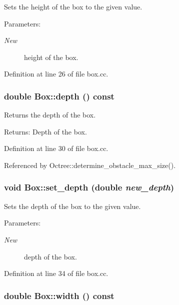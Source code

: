 Sets the height of the box to the given value. \begin{Desc}
\item[Parameters:]
\begin{description}
\item[{\em New}]height of the box. \end{description}
\end{Desc}


Definition at line 26 of file box.cc.\hypertarget{class_box_10dbd2cb5f3c37ca36792d4a1e34240d}{
\subsubsection[depth]{\setlength{\rightskip}{0pt plus 5cm}double Box::depth () const}}
\label{class_box_10dbd2cb5f3c37ca36792d4a1e34240d}


Returns the depth of the box. \begin{Desc}
\item[Returns:]Depth of the box. \end{Desc}


Definition at line 30 of file box.cc.

Referenced by Octree::determine\_\-obstacle\_\-max\_\-size().\hypertarget{class_box_8449b2ab9741bd60c24f15de96567a77}{
\subsubsection[set\_\-depth]{\setlength{\rightskip}{0pt plus 5cm}void Box::set\_\-depth (double {\em new\_\-depth})}}
\label{class_box_8449b2ab9741bd60c24f15de96567a77}


Sets the depth of the box to the given value. \begin{Desc}
\item[Parameters:]
\begin{description}
\item[{\em New}]depth of the box. \end{description}
\end{Desc}


Definition at line 34 of file box.cc.\hypertarget{class_box_cceec88bdb7cccd65b090837e919982c}{
\subsubsection[width]{\setlength{\rightskip}{0pt plus 5cm}double Box::width () const}}
\label{class_box_cceec88bdb7cccd65b090837e919982c}


